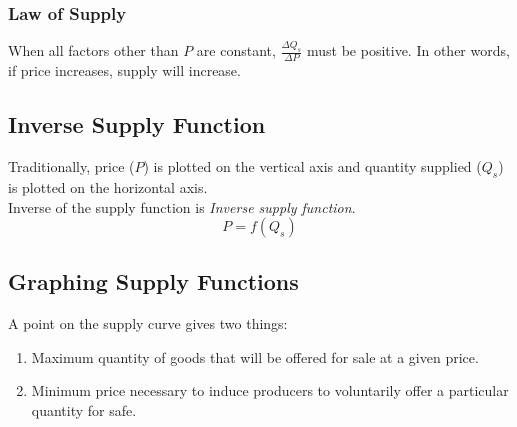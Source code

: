 \documentclass[oneside]{book}
\begin{document}
\subsubsection{Law of Supply}
When all factors other than \(P\) are constant, \(\displaystyle \frac{\Delta Q_s}{\Delta P}\) must be positive. In other words, if price increases, supply will increase.

\subsection{Inverse Supply Function}
Traditionally, price (\(P\)) is plotted on the vertical axis and quantity supplied (\(Q_s\)) is plotted on the horizontal axis.\\
Inverse of the supply function is \textit{Inverse supply function}.
\[
	P = f(Q_s)
\]

\subsection{Graphing Supply Functions}
A point on the supply curve gives two things:
\begin{enumerate}
	\item Maximum quantity of goods that will be offered for sale at a given price.
	\item Minimum price necessary to induce producers to voluntarily offer a particular quantity for safe.
\end{enumerate}



\end{document}
